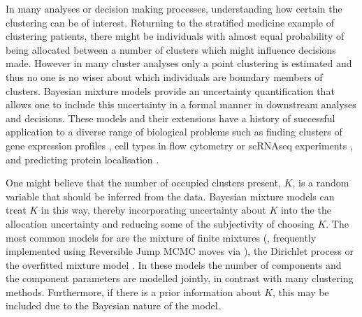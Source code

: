 \documentclass{bioinfo}
\begin{document}
In many analyses or decision making processes, understanding how certain the clustering can be of interest. Returning to the stratified medicine example of clustering patients, there might be individuals with almost equal probability of being allocated between a number of clusters which might influence decisions made.
However in many cluster analyses only a point clustering is estimated and thus no one is no wiser about which individuals are boundary members of clusters. Bayesian mixture models provide an uncertainty quantification that allows one to include this uncertainty in a formal manner in downstream analyses and decisions. These models and their extensions have a history of successful application to a diverse range of biological problems such as finding clusters of gene expression profiles \citep{medvedovic2002bayesian}, cell types in flow cytometry \citep{chan2008statistical, hejblum2019sequential} or scRNAseq experiments \citep{prabhakaran2016dirichlet}, and predicting protein localisation \citep{crook2018bayesian}.

One might believe that the number of occupied clusters present, $K$, is a random variable that should be inferred from the data. Bayesian mixture models can treat $K$ in this way, thereby incorporating uncertainty about $K$ into the the allocation uncertainty and reducing some of the subjectivity of choosing $K$. The most common models for are the mixture of finite mixtures (\citealp{miller2018mixture}, frequently implemented using Reversible Jump MCMC moves via \citealp{richardson1997bayesian}), the Dirichlet process \citep{ferguson1973bayesian, neal2000markov} or the overfitted mixture model \citep{van2015overfitting}. In these models the number of components and the component parameters are modelled jointly, in contrast with many clustering methods. Furthermore, if there is a prior information about $K$, this may be included due to the Bayesian nature of the model. 
\end{document}
